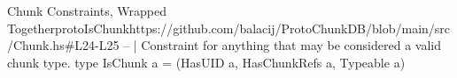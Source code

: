\begin{haskell}{Chunk Constraints, Wrapped Together}{protoIsChunk}{https://github.com/balacij/ProtoChunkDB/blob/main/src/Chunk.hs\#L24-L25}
-- | Constraint for anything that may be considered a valid chunk type.
type IsChunk a = (HasUID a, HasChunkRefs a, Typeable a)
\end{haskell}
